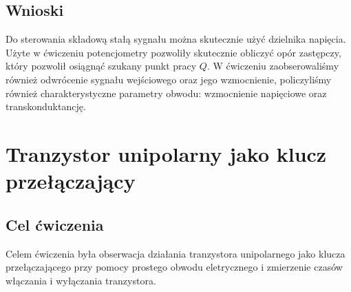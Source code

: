 \documentclass[11pt]{article}
\begin{document}
\subsection{Wnioski}
Do sterowania składową stałą sygnału można skutecznie użyć dzielnika napięcia. Użyte w ćwiczeniu potencjometry pozwoliły skutecznie obliczyć opór zastępczy, który pozwolił osiągnąć szukany punkt pracy $Q$. W ćwiczeniu zaobserowaliśmy również 
odwrócenie sygnału wejściowego oraz jego wzmocnienie, policzyliśmy również charakterystyczne parametry obwodu: wzmocnienie napięciowe oraz transkonduktancję.
\section{Tranzystor unipolarny jako klucz przełączający}
\subsection{Cel ćwiczenia}
Celem ćwiczenia była obserwacja działania tranzystora unipolarnego jako klucza przełączającego przy pomocy prostego obwodu eletrycznego i zmierzenie czasów włączania i wyłączania tranzystora.
\end{document}
